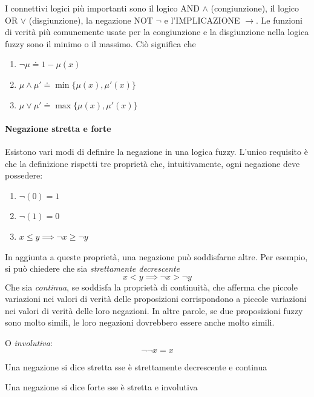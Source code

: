 I connettivi logici più importanti sono il logico AND $\land$ (congiunzione), il logico OR $\lor$ (disgiunzione), la negazione NOT $\lnot$ e l'IMPLICAZIONE $\rightarrow$. Le funzioni di verità più comunemente usate per la congiunzione e la disgiunzione nella logica fuzzy sono il minimo o il massimo. Ciò significa che

\begin{enumerate}
\item{$\neg \mu \doteq 1 - \mu(x)$} 
\item{$\mu \wedge \mu' \doteq \min\{\mu(x),\mu'(x)\}$}
\item{$\mu \vee \mu' \doteq \max\{\mu(x),\mu'(x)\}$}
\end{enumerate}

\paragraph{Negazione stretta e forte}
Esistono vari modi di definire la negazione in una logica fuzzy. L’unico requisito è che la definizione rispetti tre proprietà che, intuitivamente, ogni negazione deve possedere:
\begin{enumerate}
    \item{$\neg(0) = 1$} 
    \item{$\neg(1) = 0$}
    \item{$x \leq y \implies \neg x \geq \neg y$}
\end{enumerate}

In aggiunta a queste proprietà, una negazione può soddisfarne altre. Per esempio, si può chiedere che sia \textit{strettamente decrescente}
$$x < y \implies \neg x > \neg y$$
Che sia \textit{continua}, se soddisfa la proprietà di continuità, che afferma che piccole variazioni nei valori di verità delle proposizioni corrispondono a piccole variazioni nei valori di verità delle loro negazioni. In altre parole, se due proposizioni fuzzy sono molto simili, le loro negazioni dovrebbero essere anche molto simili.

O \textit{involutiva}:
$$\neg \neg x = x$$

\begin{definizione}
    Una negazione si dice stretta sse è strettamente decrescente e
    continua
\end{definizione}

\begin{definizione}
    Una negazione si dice forte sse è stretta e involutiva
\end{definizione}

